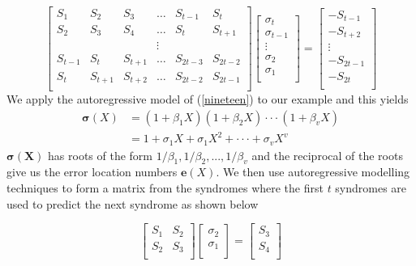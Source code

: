 \documentclass[fontsize=12pt]{article}
\begin{document}
\begin{equation}
\begin{bmatrix}
    S_{1}       &  S_{2} &  S_{3} & \dots &  S_{t-1}&  S_{t} \\
    S_{2}       &  S_{3} &  S_{4} & \dots &  S_{t}&  S_{t+1} \\
    &&&\vdots{} \\
    S_{t-1}       &  S_{t} &  S_{t+1} & \dots &  S_{2t-3}&  S_{2t-2} \\
    S_{t}       &  S_{t+1} &  S_{t+2} & \dots &  S_{2t-2}&  S_{2t-1} \\
\end{bmatrix}
\begin{bmatrix}
    \sigma_{t}\\
    \sigma_{t-1}\\
    \vdots{}\\
    \sigma_{2}\\
    \sigma_{1}\\
    
\end{bmatrix}
=
\begin{bmatrix}
     -S_{t-1}\\
    -S_{t+2}\\
    \vdots{}\\
    -S_{2t-1}\\
    -S_{2t}\\
\end{bmatrix}
\label{nineteen}
\end{equation}
We apply the autoregressive model of (\ref{nineteen}) to our example and this yields
\begin{equation}
\begin{split}
\mathbf{\sigma}(X)&=(1+\beta_1X)(1+\beta_2X)\cdot\cdot\cdot(1+\beta_vX)\\
&=1+ \sigma_1X+\sigma_1X^2+\cdot\cdot\cdot+\sigma_vX^v
\end{split}
\label{twenty}
\end{equation}
$\mathbf{\sigma(X)}$ has roots of the form $1/\beta_1,1/\beta_2,...,1/\beta_v$ and the reciprocal of the roots give us the error location numbers $\mathbf{e}(X)$. We then use autoregressive modelling techniques to form a matrix from the syndromes where the first $t$ syndromes are used to predict the next syndrome as shown below

\begin{equation*}
\begin{bmatrix}
    S_{1}       &  S_{2} \\
    S_{2}       &  S_{3} \\
\end{bmatrix}
\begin{bmatrix}
    \sigma_{2}\\
    \sigma_{1}\\
   \end{bmatrix}
=
\begin{bmatrix}
     S_{3}\\
    S_{4}\\
\end{bmatrix}
\end{equation*}
\end{document}
